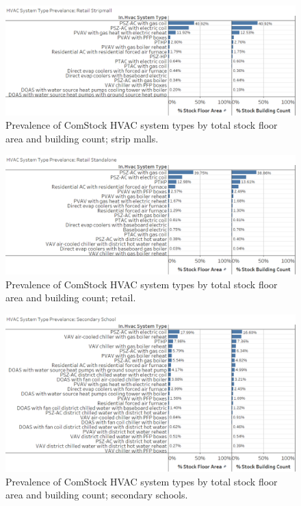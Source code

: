 \begin{figure}
    \centering \includegraphics[width=1.0\textwidth]{figures/HVAC_SYS_Type_PREV_Retail_Stripmall.png}
    \caption[HVAC system type prevalence in strip malls]{Prevalence of ComStock HVAC system types by total stock floor area and building count; strip malls.}
    \label{fig:hvac_sys_type_prevalence_retail_strip_mall}
\end{figure}

\begin{figure}
    \centering \includegraphics[width=1.0\textwidth]{figures/HVAC_SYS_Type_PREV_Retail.png}
    \caption[HVAC system type prevalence in retail]{Prevalence of ComStock HVAC system types by total stock floor area and building count; retail.}
    \label{fig:hvac_sys_type_prevalence_retail}
\end{figure}

\begin{figure}
    \centering \includegraphics[width=1.0\textwidth]{figures/HVAC_SYS_Type_PREV_Secondary_School.png}
    \caption[HVAC system type prevalence in secondary schools]{Prevalence of ComStock HVAC system types by total stock floor area and building count; secondary schools.}
    \label{fig:hvac_sys_type_prevalence_secondary_school}
\end{figure}

